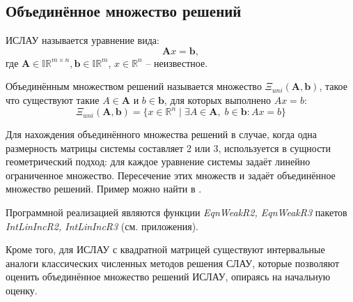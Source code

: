 \subsection{Объединённое множество решений}

\begin{definition}[ИСЛАУ]
	ИСЛАУ называется уравнение вида:
	\begin{equation}
		\mathbf{A}x = \mathbf{b},
	\end{equation}
	где $\mathbf{A} \in \mathbb{IR}^{m \times n}, \mathbf{b} \in \mathbb{IR}^m$, $x \in \mathbb{R}^n$ -- неизвестное.
\end{definition}

\begin{definition}
	Объединённым множеством решений называется множество $\Xi_{uni}(\mathbf{A}, \mathbf{b})$, такое что существуют такие $A \in \mathbf{A}$ и $b \in \mathbf{b}$, для которых выполнено $Ax = b$:
	\begin{equation}
	\Xi_{uni}(\mathbf{A}, \mathbf{b}) = \{ x \in \mathbb{R}^n \; | \; \exists A \in \mathbf{A}, \; b \in \mathbf{b}: Ax = b \}
	\end{equation}
\end{definition}

Для нахождения объединённого множества решений в случае, когда одна размерность матрицы системы составляет 2 или 3, используется в сущности геометрический подход: для каждое уравнение системы задаёт линейно ограниченное множество. Пересечение этих множеств и задаёт объединённое множество решений. Пример можно найти в \cite[стр. 39, рис. 15]{intv}.

Программной реализацией являются функции \textit{EqnWeakR2, EqnWeakR3} пакетов \textit{IntLinIncR2, IntLinIncR3} (см. приложения).

Кроме того, для ИСЛАУ с квадратной матрицей существуют интервальные аналоги классических численных методов решения СЛАУ, которые позволяют оценить объединённое множество решений ИСЛАУ, опираясь на начальную оценку.

